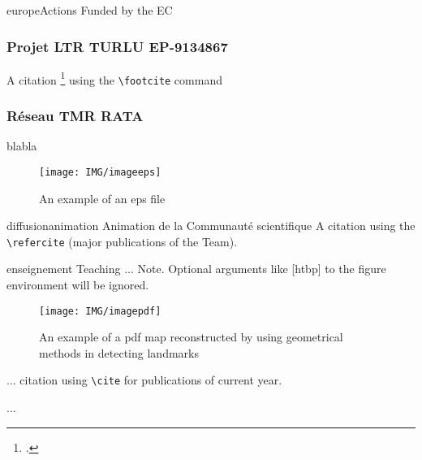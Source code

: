 \documentclass{ra2015}
\begin{document}
\begin{module}{}{europe}{Actions Funded by the EC}
\subsubsection{Projet LTR TURLU EP-9134867}
A citation \footcite{MB07} using the \verb=\footcite= command
\subsubsection{Réseau TMR RATA}
blabla

\begin{figure}
\begin{center}
\texttt{[image: IMG/imageeps]}
\end{center}
\caption{An example of an eps file}
\label{fig:completemap}
\end{figure}


\end{module}




\begin{module}{diffusion}{animation}
  {Animation de la Communauté scientifique}
A citation  using the \verb+\refercite+ 
(major publications of the Team).
\end{module}



\begin{module}{}{enseignement}
  {Teaching}
...
Note. Optional arguments like [htbp] to the figure environment will be ignored.

\begin{center}
\begin{figure}
\texttt{[image: IMG/imagepdf]}

\caption{An example of a pdf map reconstructed by using geometrical methods in detecting landmarks}
\label{fig:pdffile}
\end{figure}
\end{center}

...
citation \cite{jmtXML} using \verb+\cite+ for publications of current year.

...
\end{module}
\end{document}
